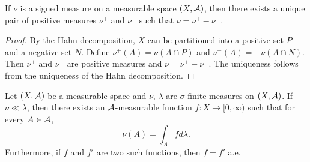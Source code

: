\begin{corollary}
    If $\nu$ is a signed measure on a measurable space $(X,\mathcal{A})$, 
    then there exists a unique pair of positive measures $\nu^+$ 
    and $\nu^-$ such that $\nu = \nu^+ - \nu^-$.
\end{corollary}
\begin{proof}
    By the Hahn decomposition, $X$ can be partitioned into a positive 
    set $P$ and a negative set $N$. Define $\nu^+(A) = \nu(A\cap P)$ 
    and $\nu^-(A) = -\nu(A\cap N)$. Then $\nu^+$ and $\nu^-$ are 
    positive measures and $\nu = \nu^+ - \nu^-$. The uniqueness 
    follows from the uniqueness of the Hahn decomposition.
\end{proof}

\begin{theorem}
    Let $(X,\mathcal{A})$ be a measurable space and $\nu$, $\lambda$ are 
    $\sigma$-finite measures on $(X,\mathcal{A})$. If $\nu\ll\lambda$, then 
    there exists an $\mathcal{A}$-measurable function $f:X\to[0,\infty)$ 
    such that for every $A\in\mathcal{A}$,
    \begin{equation*}
        \nu(A) = \int_A fd\lambda.
    \end{equation*}
    Furthermore, if $f$ and $f'$ are two such functions, then 
    $f = f'$ a.e.
\end{theorem}
